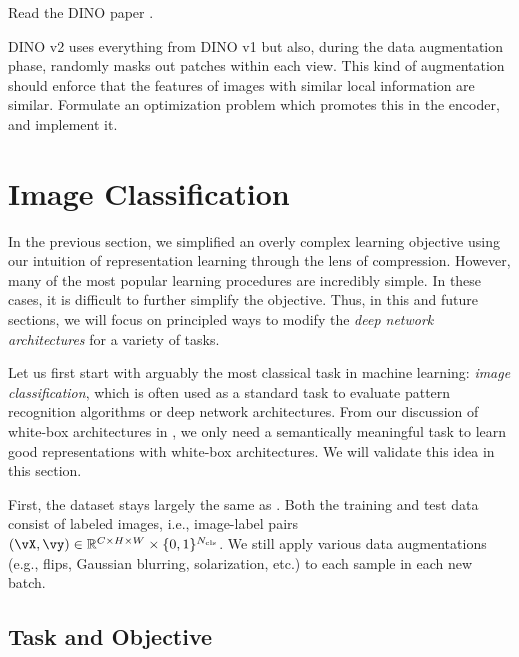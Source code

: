 \documentclass[../../book-main.tex]{subfiles}
\begin{document}
\begin{exercise}
    Read the DINO paper \cite{caron2021emerging}.
\end{exercise}

\begin{exercise}
    DINO v2 \cite{oquab2023dinov2} uses everything from DINO v1 but also, during the data augmentation phase, randomly masks out patches within each view. This kind of augmentation should enforce that the features of images with similar local information are similar. Formulate an optimization problem which promotes this in the encoder, and implement it.
\end{exercise}


\section{Image Classification}\label{sec:image_classification}

In the previous section, we simplified an overly complex learning objective using our intuition of representation learning through the lens of compression. However, many of the most popular learning procedures are incredibly simple. In these cases, it is difficult to further simplify the objective. Thus, in this and future sections, we will focus on principled ways to modify the \textit{deep network architectures} for a variety of tasks.

Let us first start with arguably the most classical task in machine learning: \textit{image classification}, which is often used as a standard task to evaluate pattern recognition algorithms or deep network architectures. From our discussion of white-box architectures in , we only need a semantically meaningful task to learn good representations with white-box architectures. We will validate this idea in this section.

First, the dataset stays largely the same as . Both the training and test data consist of labeled images, i.e., image-label pairs \((\vX, \vy) \in \R^{C \times H \times W} \times \{0, 1\}^{N_{\cls}}\). We still apply various data augmentations (e.g., flips, Gaussian blurring, solarization, etc.) to each sample in each new batch. 

\subsection{Task and Objective} \label{sub:image_classification_objective}
\end{document}
